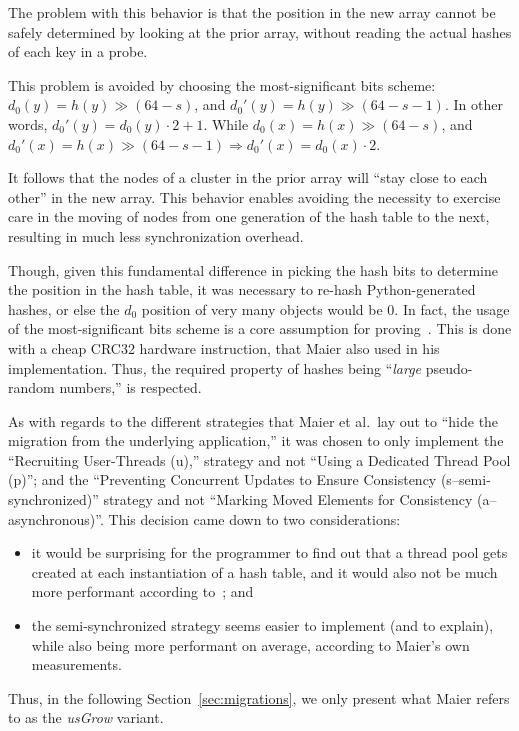 The problem with this behavior is that the position in the new array cannot be safely determined by looking at the prior array, without reading the actual hashes of each key in a probe.

This problem is avoided by choosing the most-significant bits scheme: $d_0(y) = h(y) \gg (64 - s)$, and $d_0'(y) = h(y) \gg (64 - s - 1)$.
In other words, $d_0'(y) = d_0(y) \cdot 2 + 1$.
While $d_0(x) = h(x) \gg (64 - s)$, and $d_0'(x) = h(x) \gg (64 - s - 1) \Rightarrow d_0'(x) = d_0(x) \cdot 2$.

It follows that the nodes of a cluster in the prior array will ``stay close to each other'' in the new array.
This behavior enables avoiding the necessity to exercise care in the moving of nodes from one generation of the hash table to the next, resulting in much less synchronization overhead.

Though, given this fundamental difference in picking the hash bits to determine the position in the hash table, it was necessary to re-hash Python-generated hashes, or else the $d_0$ position of very many objects would be $0$.
In fact, the usage of the most-significant bits scheme is a core assumption for proving~\cite[Lemma~5.1]{maier}.
This is done with a cheap CRC32 hardware instruction, that Maier also used in his implementation.
Thus, the required property of hashes being ``\emph{large} pseudo-random numbers,'' is respected.

As with regards to the different strategies that Maier et al.\ lay out to ``hide the migration from the underlying application,'' it was chosen to only implement the ``Recruiting User-Threads (u),'' strategy and not ``Using a Dedicated Thread Pool (p)''; and the ``Preventing Concurrent Updates to Ensure Consistency (s--semi-synchronized)'' strategy and not ``Marking Moved Elements for Consistency (a--asynchronous)''.
This decision came down to two considerations:
\begin{itemize}
	\item it would be surprising for the programmer to find out that a thread pool gets created at each instantiation of a hash table, and it would also not be much more performant according to~\cite[\S8.4, Using Dedicated Growing Threads]{maier}; and
	\item the semi-synchronized strategy seems easier to implement (and to explain), while also being more performant on average, according to Maier's own measurements.
\end{itemize}
Thus, in the following Section~\ref{sec:migrations}, we only present what Maier refers to as the \emph{usGrow} variant.



